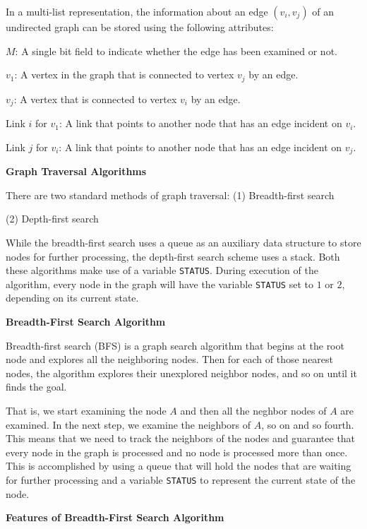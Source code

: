 \vskip 1mm
In a multi-list representation, the information about an edge $(v_i,v_j)$ of an undirected graph can be stored using the following attributes:

\vskip 3mm
\qquad $M$: A single bit field to indicate whether the edge has been examined or not.

\vskip 3mm
\qquad$v_1$: A vertex in the graph that is connected to vertex $v_j$ by an edge.

\vskip 3mm
\qquad $v_j$: A vertex that is connected to vertex $v_i$ by an edge.

\vskip 3mm
\qquad Link $i$ for $v_1$: A link that points to another node that has an edge incident on $v_i$.

\vskip 3mm
\qquad Link $j$ for $v_i$: A link that points to another node that has an edge incident on $v_j$.

\filbreak
\vskip 1cm
{\bf Graph Traversal Algorithms}

\vskip 1mm
There are two standard methods of graph traversal:
\vskip 3mm
\qquad(1) Breadth-first search

\vskip 3mm
\qquad(2) Depth-first search

\vskip 1mm
While the breadth-first search uses a queue as an auxiliary data structure to store nodes for further processing, the depth-first search scheme uses a stack. Both these algorithms make use of a variable {\tt STATUS}. During execution of the algorithm, every node in the graph will have the variable {\tt STATUS} set to $1$ or $2$, depending on its current state.

\filbreak
\vskip 1cm
{\bf Breadth-First Search Algorithm}

\vskip 1mm
Breadth-first search (BFS) is a graph search algorithm that begins at the root node and explores all the neighboring nodes. Then for each of those nearest nodes, the algorithm explores their unexplored neighbor nodes, and so on until it finds the goal.

\vskip 1mm
That is, we start examining the node $A$ and then all the neghbor nodes of $A$ are examined. In the next step, we examine the neighbors of $A$, so on and so fourth. This means that we need to track the neighbors of the nodes and guarantee that every node in the graph is processed and no node is processed more than once. This is accomplished by using a queue that will hold the nodes that are waiting for further processing and a variable {\tt STATUS} to represent the current state of the node.

\vskip 3mm
{\bf Features of Breadth-First Search Algorithm}

